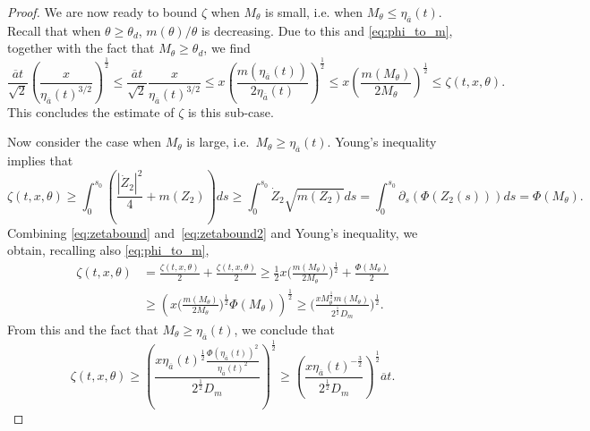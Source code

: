 \documentclass[11pt]{article}    %
\begin{document}
\begin{proof}
We are now ready to bound $\zeta$ when $M_\theta$ is small, i.e. when $M_\theta \leq \eta_{\overline a}(t)$.
%
%
Recall that when $\theta \geq \theta_d$, $m(\theta)/\theta$ is decreasing.  Due to this and \eqref{eq:phi_to_m}, together with the fact that $M_\theta \geq \theta_d$, we find 
\[
		\frac{\overline a t}{\sqrt2} \left(\frac{x}{\eta_{\overline a}(t)^{3/2}} \right)^\frac12
		\leq \frac{\overline a t}{\sqrt2} \frac{x}{\eta_{\overline a}(t)^{3/2}}
		\leq x \left( \frac{m(\eta_{\overline a}(t))}{2\eta_{\overline a}(t)} \right)^\frac{1}{2}
		\leq x \left( \frac{m(M_\theta)}{2M_\theta} \right)^\frac{1}{2}
		\leq \zeta(t,x,\theta).
\]
This concludes the estimate of $\zeta$ is this sub-case.

%
%

Now consider the case when $M_\theta$ is large, i.e.~$M_\theta \geq \eta_{\overline a}(t)$.  Young's inequality implies that
\begin{equation}\label{eq:zetabound2}
\zeta(t,x,\theta) \geq \int_0^{s_0} \left( \frac{|\dot Z_2|^2}{4} +  m(Z_2) \right) ds
		\geq \int_0^{s_0} \dot Z_2 \sqrt{m(Z_2)} ds
		= \int_0^{s_0} \partial_s (\Phi(Z_2(s))) ds
		= \Phi(M_\theta).
\end{equation}
Combining \eqref{eq:zetabound} and~\eqref{eq:zetabound2} and Young's inequality, we obtain, recalling also \eqref{eq:phi_to_m},
\begin{equation*}
\begin{split}
	\zeta(t,x,\theta) &= \frac{\zeta(t,x,\theta)}{2} + \frac{\zeta(t,x,\theta)}{2}
		\geq \frac12 x \Big( \frac{m(M_\theta)}{2M_\theta} \Big)^\frac{1}{2} + \frac{\Phi(M_\theta)}{2}
		\\ &\geq \left( x \Big( \frac{m(M_\theta)}{2M_\theta} \Big)^\frac{1}{2} \Phi(M_\theta)\right)^\frac12
		\geq \Bigg( \frac{x M_\theta^\frac{1}{2} m(M_\theta)}{2^\frac12 D_m} \Bigg)^\frac12.
\end{split}
\end{equation*}
From this and the fact that $M_\theta \geq \eta_{\overline a}(t)$, we conclude that
\begin{equation}
	\zeta(t,x,\theta)
		\geq \left( \frac{x \eta_{\overline a}(t)^\frac{1}{2} \frac{\Phi(\eta_{\overline a}(t))^2}{\eta_{\overline a}(t)^2} }{2^\frac12 D_m} \right)^\frac12 
		\geq \left( \frac{x \eta_{\overline a}(t)^{-\frac{3}{2}}}{2^\frac12 D_m} \right)^\frac12 \overline{a}t.
\end{equation}


\end{proof}
\end{document}
